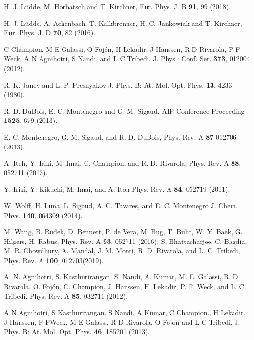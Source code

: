 \documentclass[10pt,showpacs,showkeys,twocolumn]{revtex4}
\begin{document}
\begin{thebibliography}{}
H. J. L\"udde, M. Horbatsch and T. Kirchner, Eur. Phys. J. B \textbf{91}, 99 (2018).

H. J. L\"udde, A. Achenbach, T. Kalkbrenner, H.-C. Jankowiak and T. Kirchner,
Eur. Phys. J. D \textbf{70}, 82 (2016).

C Champion, M E Galassi, O Foj\'{o}n, H Lekadir, J Hanssen, R D Rivarola, P F Weck, A N Agnihotri, S Nandi, and L C Tribedi. 
J. Phys.: Conf. Ser. \textbf{373}, 012004 (2012).


R. K. Janev and L. P. Presnyakov 
J. Phys. B: At. Mol. Opt. Phys.  \textbf{13}, 4233 (1980).

R. D. DuBois, E. C. Montenegro and G. M. Sigaud,
AIP Conference Proceeding \textbf{1525}, 679 (2013).

 E. C. Montenegro, G. M. Sigaud,  and R. D. DuBois, Phys. Rev. A \textbf{87} 012706 (2013).


A. Itoh, Y. Iriki, M. Imai, C. Champion, and R. D. Rivarola, 
Phys. Rev. A \textbf{88}, 052711 (2013).

Y. Iriki, Y. Kikuchi, M. Imai, and A. Itoh
Phys. Rev. A \textbf{84}, 052719 (2011). 


W. Wolff, H. Luna, L. Sigaud, A. C. Tavares, and E. C. Montenegro
J. Chem. Phys. \textbf{140}, 064309 (2014).

M. Wang, B. Rudek, D. Bennett, P. de Vera, M. Bug, T. Buhr, W. Y. Baek, G. Hilgers, H. Rabus, 
Phys. Rev. A \textbf{93}, 052711 (2016). S. Bhattacharjee, C. Bagdia, M. R. Chowdhury, A. Mandal, J. M. Monti, R. D. Rivarola, and L. C. Tribedi, 
Phys. Rev. A \textbf{100}, 012703(2019).

A. N. Agnihotri, S. Kasthurirangan, S. Nandi, A.
Kumar, M. E. Galassi, R. D. Rivarola, O. Foj\'{o}n, C. Champion, J. Hanssen, H. Lekadir, P. F. Weck, and L. C. Tribedi. 
Phys. Rev. A \textbf{85}, 032711 (2012).

A N Agnihotri, S Kasthurirangan, S Nandi, A Kumar, C Champion,, H Lekadir, J Hanssen, P FWeck, M E Galassi, R D Rivarola, O Fojon and L C Tribedi, 
J. Phys. B: At. Mol. Opt. Phys.  \textbf{46}, 185201 (2013).


\end{thebibliography}
\end{document}
